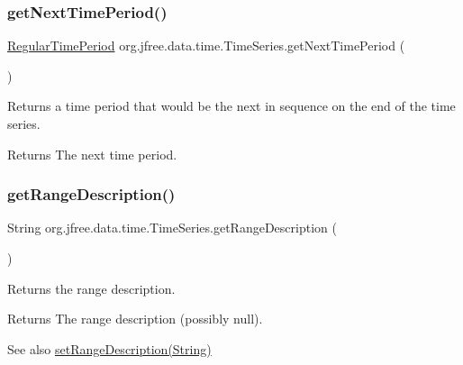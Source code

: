 \subsubsection{\texorpdfstring{get\+Next\+Time\+Period()}{getNextTimePeriod()}}
{\footnotesize\ttfamily \mbox{\hyperlink{classorg_1_1jfree_1_1data_1_1time_1_1_regular_time_period}{Regular\+Time\+Period}} org.\+jfree.\+data.\+time.\+Time\+Series.\+get\+Next\+Time\+Period (\begin{DoxyParamCaption}{ }\end{DoxyParamCaption})}

Returns a time period that would be the next in sequence on the end of the time series.

\begin{DoxyReturn}{Returns}
The next time period. 
\end{DoxyReturn}
\mbox{\label{classorg_1_1jfree_1_1data_1_1time_1_1_time_series_a9a904357e8aef246ccadba5165add5e1}} 
\subsubsection{\texorpdfstring{get\+Range\+Description()}{getRangeDescription()}}
{\footnotesize\ttfamily String org.\+jfree.\+data.\+time.\+Time\+Series.\+get\+Range\+Description (\begin{DoxyParamCaption}{ }\end{DoxyParamCaption})}

Returns the range description.

\begin{DoxyReturn}{Returns}
The range description (possibly {\ttfamily null}).
\end{DoxyReturn}
\begin{DoxySeeAlso}{See also}
\mbox{\hyperlink{classorg_1_1jfree_1_1data_1_1time_1_1_time_series_a67fa8ee54ca85ec0e7b645d1464d11f5}{set\+Range\+Description(\+String)}} 
\end{DoxySeeAlso}
\mbox{\label{classorg_1_1jfree_1_1data_1_1time_1_1_time_series_aa66c43272282abd50947c39b4bfc8576}} 
